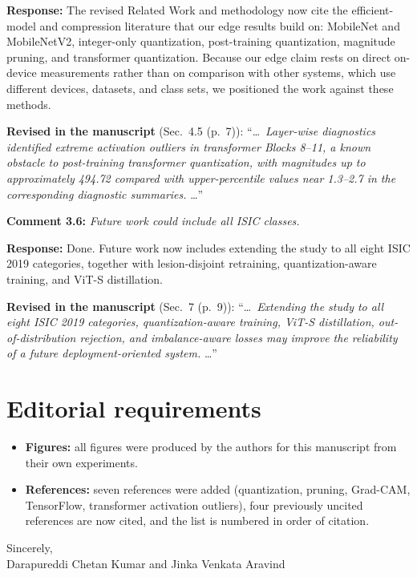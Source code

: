 \documentclass[11pt,a4paper]{article}
\begin{document}
\textbf{Response:} The revised Related Work and methodology now cite the efficient-model and compression literature that our edge results build on: MobileNet and MobileNetV2, integer-only quantization, post-training quantization, magnitude pruning, and transformer quantization. Because our edge claim rests on direct on-device measurements rather than on comparison with other systems, which use different devices, datasets, and class sets, we positioned the work against these methods.

\textbf{Revised in the manuscript} (Sec.~4.5 (p.~7)): ``\ldots\ \emph{Layer-wise diagnostics identified extreme activation outliers in transformer Blocks 8--11, a known obstacle to post-training transformer quantization, with magnitudes up to approximately 494.72 compared with upper-percentile values near 1.3--2.7 in the corresponding diagnostic summaries.} \ldots''

\medskip
\textbf{Comment 3.6:} \emph{Future work could include all ISIC classes.}

\textbf{Response:} Done. Future work now includes extending the study to all eight ISIC 2019 categories, together with lesion-disjoint retraining, quantization-aware training, and ViT-S distillation.

\textbf{Revised in the manuscript} (Sec.~7 (p.~9)): ``\ldots\ \emph{Extending the study to all eight ISIC 2019 categories, quantization-aware training, ViT-S distillation, out-of-distribution rejection, and imbalance-aware losses may improve the reliability of a future deployment-oriented system.} \ldots''


\section*{Editorial requirements}
\begin{itemize}
\item \textbf{Figures:} all figures were produced by the authors for this manuscript from their own experiments.
\item \textbf{References:} seven references were added (quantization, pruning, Grad-CAM, TensorFlow, transformer activation outliers), four previously uncited references are now cited, and the list is numbered in order of citation.
\end{itemize}

\medskip
Sincerely,\\
Darapureddi Chetan Kumar and Jinka Venkata Aravind
\end{document}
